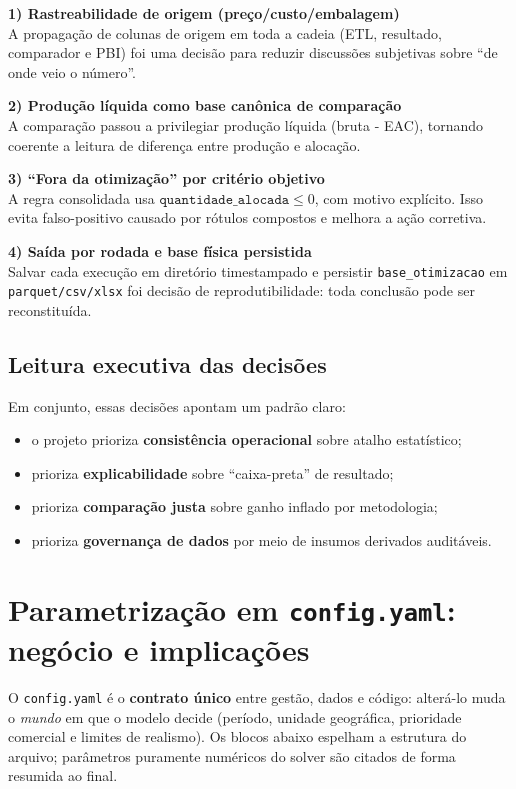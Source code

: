 \documentclass[11pt,a4paper]{article}
\begin{document}
\textbf{1) Rastreabilidade de origem (preço/custo/embalagem)}\\
A propagação de colunas de origem em toda a cadeia (ETL, resultado, comparador e
PBI) foi uma decisão para reduzir discussões subjetivas sobre ``de onde veio o
número''.

\textbf{2) Produção líquida como base canônica de comparação}\\
A comparação passou a privilegiar produção líquida (bruta - EAC), tornando
coerente a leitura de diferença entre produção e alocação.

\textbf{3) ``Fora da otimização'' por critério objetivo}\\
A regra consolidada usa \(\texttt{quantidade\_alocada} \le 0\), com motivo
explícito. Isso evita falso-positivo causado por rótulos compostos e melhora a
ação corretiva.

\textbf{4) Saída por rodada e base física persistida}\\
Salvar cada execução em diretório timestampado e persistir
\texttt{base\_otimizacao} em \texttt{parquet/csv/xlsx} foi decisão de
reprodutibilidade: toda conclusão pode ser reconstituída.

\subsection{Leitura executiva das decisões}

Em conjunto, essas decisões apontam um padrão claro:
\begin{itemize}[leftmargin=1.2cm]
    \item o projeto prioriza \textbf{consistência operacional} sobre atalho estatístico;
    \item prioriza \textbf{explicabilidade} sobre ``caixa-preta'' de resultado;
    \item prioriza \textbf{comparação justa} sobre ganho inflado por metodologia;
    \item prioriza \textbf{governança de dados} por meio de insumos derivados auditáveis.
\end{itemize}

\section{Parametrização em \texttt{config.yaml}: negócio e implicações}
\label{sec:param-config}

O \texttt{config.yaml} é o \textbf{contrato único} entre gestão, dados e código:
alterá-lo muda o \textit{mundo} em que o modelo decide (período, unidade
geográfica, prioridade comercial e limites de realismo). Os blocos abaixo
espelham a estrutura do arquivo; parâmetros puramente numéricos do solver são
citados de forma resumida ao final.
\end{document}
